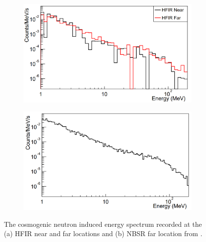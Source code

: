 \begin{figure}[htbp]
\centering
\begin{subfigure}{.5\textwidth}
  \centering
  \includegraphics[width=\linewidth]{Chapter2/Figs/Raster/Prospect_HFIR_nearFarPlot.png}
  \captionsetup{width=.9\linewidth}
  \caption{}
  \label{subFig:Prospect_HFIR_nearFarPlot}
\end{subfigure}%
\begin{subfigure}{.5\textwidth}
  \centering
\includegraphics[width=\linewidth]{Chapter2/Figs/Raster/Prospect_NBSR_farPlot.png}
  \captionsetup{width=.9\linewidth}
  \caption{}
  \label{subFig:Prospect_NBSR_farPlot}
\end{subfigure}
\caption{The cosmogenic neutron induced energy spectrum recorded at the (a) HFIR near and far locations and (b) NBSR far location from \cite{Ashenfelter_2016}.}
\label{fig:Prospect_HFIR_NBSR_nearFarPlots}
\end{figure}

